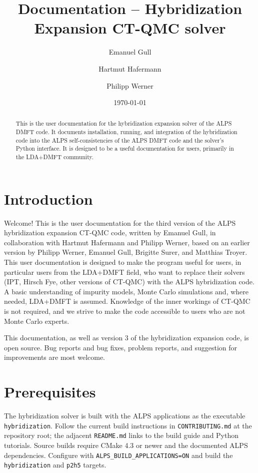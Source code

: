 \documentclass[aps,prb,floatfix,superscriptaddress,twocolumn,notitlepage]{revtex4-1}
\begin{document}
\newcommand{\Emanuel}{\href{mailto:gull@pks.mpg.de}{Emanuel }}
\title{Documentation -- Hybridization Expansion CT-QMC solver}
\author{Emanuel Gull}
\author{Hartmut Hafermann}
\author{Philipp Werner}
\date{\today }

\begin{abstract}
This is the user documentation for the hybridization expansion solver of the ALPS DMFT code. It documents installation, running, and integration of the hybridization code into the ALPS self-consistencies of the ALPS DMFT code and the solver's Python interface. It is designed to be a useful documentation for users, primarily in the LDA+DMFT community.
\end{abstract}

\maketitle

\section{Introduction}
Welcome! This is the user documentation for the third version of the ALPS\cite{ALPS20} hybridization expansion\cite{Werner06} CT-QMC\cite{CPC_CTHYB} code, written by Emanuel Gull, in collaboration with Hartmut Hafermann and Philipp Werner, based on an earlier version\cite{ALPS_DMFT} by Philipp Werner, Emanuel Gull, Brigitte Surer, and Matthias Troyer. This user documentation is designed to make the program useful for users, in particular users from the LDA+DMFT field, who want to replace their solvers (IPT, Hirsch Fye, other versions of CT-QMC) with the ALPS hybridization code. A basic understanding of impurity models, Monte Carlo simulations and, where needed, LDA+DMFT is assumed. Knowledge of the inner workings of CT-QMC is not required, and we strive to make the code accessible to users who are not Monte Carlo experts.

This documentation, as well as version $3$ of the hybridization expansion code, is open source. Bug reports and bug fixes, problem reports, and suggestion for improvements are most welcome.

\section{Prerequisites}
The hybridization solver is built with the ALPS applications as the executable \verb#hybridization#. Follow the current build instructions in \verb#CONTRIBUTING.md# at the repository root; the adjacent \verb#README.md# links to the build guide and Python tutorials. Source builds require CMake 4.3 or newer and the documented ALPS dependencies. Configure with \verb#ALPS_BUILD_APPLICATIONS=ON# and build the \verb#hybridization# and \verb#p2h5# targets.
\end{document}
